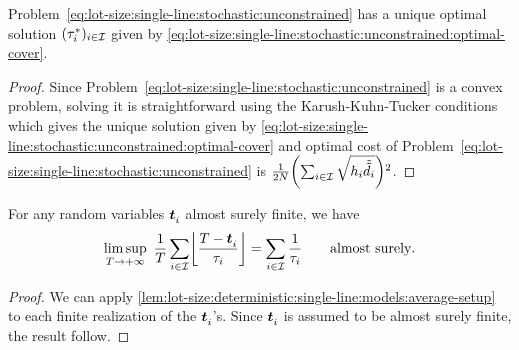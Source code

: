 \begin{lem}\label{lem:lot-size:single-line:stochastic:unconstrained:optimality}
Problem~\eqref{eq:lot-size:single-line:stochastic:unconstrained} has a unique optimal solution $(\tau_i^*)_{i\in\mathcal{I}}$ given by \cref{eq:lot-size:single-line:stochastic:unconstrained:optimal-cover}.
\end{lem}


\begin{proof}
Since Problem~\eqref{eq:lot-size:single-line:stochastic:unconstrained} is a convex problem, solving it is straightforward using the Karush-Kuhn-Tucker conditions which gives the unique solution given by \cref{eq:lot-size:single-line:stochastic:unconstrained:optimal-cover} and optimal cost of Problem~\eqref{eq:lot-size:single-line:stochastic:unconstrained} is $\frac{1}{2\nbsetups}\bracket{\sum_{i\in\REF}\sqrt{\holding_i\tilde{\tilde{\demand_i}}}}^2$.
\end{proof}





\begin{lem}\label{lem:lot-size:stochastic:single-line:models:average-setup}
For any random variables $\va t_i$ almost surely finite, we have
\begin{equation}
\limsup_{\horizon\rightarrow+\infty}\ \frac{1}{\horizon} \sum_{i\in\REF} \left\lfloor\frac{\horizon-\va t_i}{\cover_i}\right\rfloor
=
\sum_{i\in\REF} \frac{1}{\cover_i}\qquad \mbox{almost surely}.
\end{equation}
\end{lem}


\begin{proof}
We can apply \cref{lem:lot-size:deterministic:single-line:models:average-setup} to each finite realization of the $\va t_i$'s.
Since $\va t_i$ is assumed to be almost surely finite, the result follow.
\end{proof}



